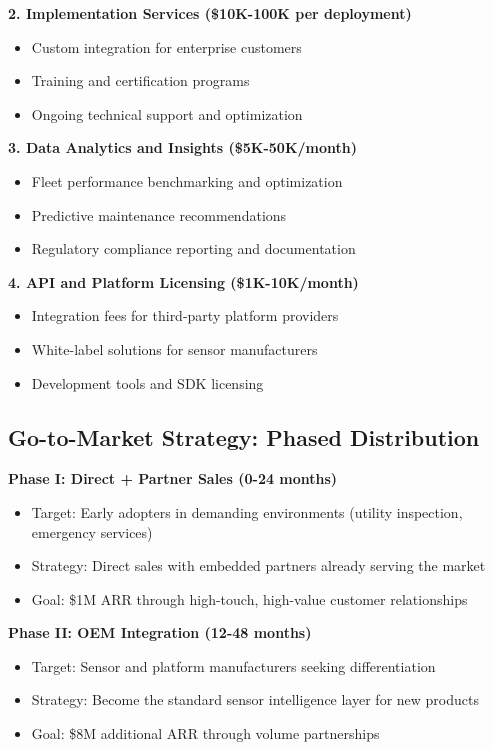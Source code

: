\documentclass[11pt,letterpaper]{article}
\begin{document}
\textbf{2. Implementation Services (\$10K-100K per deployment)}
\begin{itemize}[leftmargin=10pt, itemsep=1pt]
    \item Custom integration for enterprise customers
    \item Training and certification programs
    \item Ongoing technical support and optimization
\end{itemize}

\textbf{3. Data Analytics and Insights (\$5K-50K/month)}
\begin{itemize}[leftmargin=10pt, itemsep=1pt]
    \item Fleet performance benchmarking and optimization
    \item Predictive maintenance recommendations
    \item Regulatory compliance reporting and documentation
\end{itemize}

\textbf{4. API and Platform Licensing (\$1K-10K/month)}
\begin{itemize}[leftmargin=10pt, itemsep=1pt]
    \item Integration fees for third-party platform providers
    \item White-label solutions for sensor manufacturers
    \item Development tools and SDK licensing
\end{itemize}

\subsection*{Go-to-Market Strategy: Phased Distribution}

\textbf{Phase I: Direct + Partner Sales (0-24 months)}
\begin{itemize}[leftmargin=10pt, itemsep=1pt]
    \item Target: Early adopters in demanding environments (utility inspection, emergency services)
    \item Strategy: Direct sales with embedded partners already serving the market
    \item Goal: \$1M ARR through high-touch, high-value customer relationships
\end{itemize}

\textbf{Phase II: OEM Integration (12-48 months)}
\begin{itemize}[leftmargin=10pt, itemsep=1pt]
    \item Target: Sensor and platform manufacturers seeking differentiation
    \item Strategy: Become the standard sensor intelligence layer for new products
    \item Goal: \$8M additional ARR through volume partnerships
\end{itemize}
\end{document}
